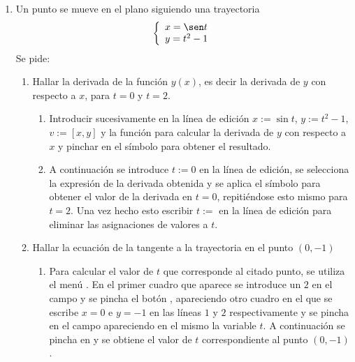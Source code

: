 \begin{enumerate}[leftmargin=*]
\begin{indicacion}
{\begin{enumerate}
\end{enumerate}
}
\end{indicacion}

\item Un punto se mueve en el plano siguiendo una trayectoria
\[\left\{
\begin{array}{l}
x=\sen t\\
y=t^{2}-1
\end{array}
\right.\]
Se pide:
\begin{enumerate}
\item Hallar la derivada de la función $y(x)$, es decir la derivada de $y$ con respecto a $x$, para $t=0$ y $t=2$.\\

\begin{indicacion}
{\begin{enumerate}
\item Introducir sucesivamente en la línea de edición $x:=\sin{t}$,
$y:=t^{2}-1$, $v:=[x,y]$ y la función 
para calcular la derivada de $y$ con respecto a $x$ y pinchar en el
símbolo \boton{=} para obtener el resultado.

\item A continuación se introduce $t:=0$ en la línea de edición, se
selecciona la expresión de la derivada obtenida y se aplica el
símbolo \boton{$\approx$} para obtener el valor de la derivada en
$t=0$, repitiéndose esto mismo para $t=2$. Una vez hecho esto
escribir $t:= $ en la línea de edición para eliminar las
asignaciones de valores a $t$.
\end{enumerate}

}
\end{indicacion}

\item Hallar la ecuación de la tangente a la trayectoria en el punto $(0,-1)$\\
\begin{indicacion}
{\begin{enumerate}
\item Para calcular el valor de $t$ que corresponde al citado punto, se
utiliza el menú . En el primer cuadro que
aparece se introduce un $2$ en el campo  y se pincha el botón , apareciendo otro cuadro
en el que se escribe $x=0$ e $y=-1$ en las líneas $1$ y $2$
respectivamente y se pincha en el campo 
apareciendo en el mismo la variable $t$. A continuación se pincha en
 y se obtiene el valor de $t$ correspondiente al
punto $(0,-1)$.


\end{enumerate}}
\end{indicacion}
\end{enumerate}
\end{enumerate}
